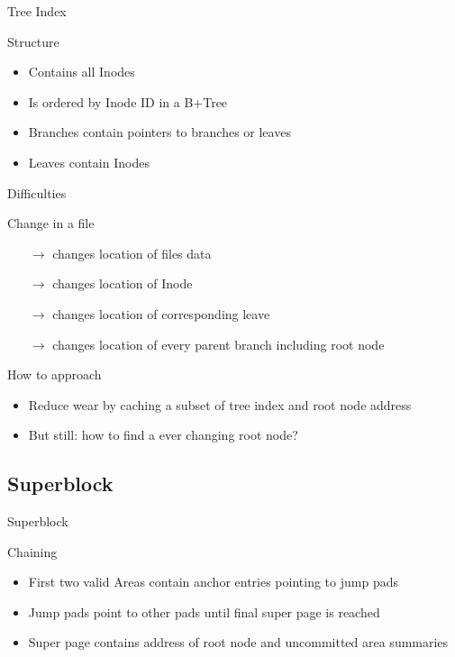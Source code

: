 \documentclass[
	,footlinenumber
	,navline=true
	,footlineauthor
	,ngerman
	]{beamer}
\begin{document}
\begin{frame}{Tree Index}
\begin{block}{Structure}
	\begin{itemize}
		\item Contains all Inodes
		\item Is ordered by Inode ID in a B+Tree
		\item Branches contain pointers to branches or leaves
		\item Leaves contain Inodes
	\end{itemize}
	
\end{block}
\end{frame}

\begin{frame}{Difficulties}
	\begin{block}{Change in a file}
		\begin{itemize}
			\item[$\rightarrow$] changes location of files data
			\item[$\rightarrow$] changes location of Inode
			\item[$\rightarrow$]changes location of corresponding leave
			\item[$\rightarrow$]changes location of every parent branch including root node
		\end{itemize}
	\end{block}
	\begin{block}{How to approach}
		\begin{itemize}
			\item Reduce wear by caching a subset of tree index and root node address
			\item But still: how to find a ever changing root node?
		\end{itemize}
	\end{block}
\end{frame}

\subsection{Superblock}
\begin{frame}{Superblock}
	\begin{block}{Chaining}
		\begin{itemize}
			\item First two valid Areas contain anchor entries pointing to jump pads
			\item Jump pads point to other pads until final super page is reached
			\item Super page contains address of root node and uncommitted area summaries
		\end{itemize}
	\end{block}
\end{frame}
\end{document}
